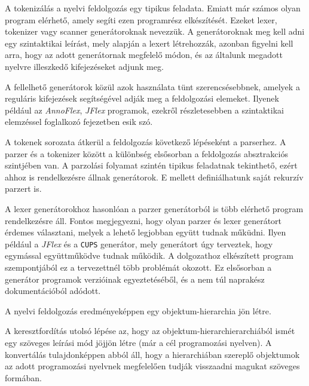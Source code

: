 A tokenizálás a nyelvi feldolgozás egy tipikus feladata.
Emiatt már számos olyan program elérhető, amely segíti ezen programrész elkészítését.
Ezeket lexer, tokenizer vagy scanner generátoroknak nevezzük.
A generátoroknak meg kell adni egy szintaktikai leírást, mely alapján a lexert létrehozzák, azonban figyelni kell arra, hogy az adott generátornak megfelelő módon, és az általunk megadott nyelvre illeszkedő kifejezéseket adjunk meg.

A fellelhető generátorok közül azok használata tünt szerencsésebbnek, amelyek a reguláris kifejezések segítségével adják meg a feldolgozási elemeket. Ilyenek például az \textit{AnnoFlex}, \textit{JFlex} programok, ezekről részletesebben a szintaktikai elemzéssel foglalkozó fejezetben esik szó.


A tokenek sorozata átkerül a feldolgozás következő lépéseként a parserhez.
A parzer és a tokenizer között a különbség elsősorban a feldolgozás absztrakciós szintjében van.
A parzolási folyamat szintén tipikus feladatnak tekinthető, ezért ahhoz is rendelkezésre állnak generátorok.
E mellett definiálhatunk saját rekurzív parzert is.

A lexer generátorokhoz hasonlóan a parzer generátorból is több elérhető program rendelkezésre áll.
Fontos megjegyezni, hogy olyan parzer és lexer generátort érdemes választani, melyek a lehető legjobban együtt tudnak műküdni.
Ilyen például a \textit{JFlex} és a \texttt{CUPS} generátor, mely generátort úgy terveztek, hogy egymással együttműködve tudnak működik.
A dolgozathoz elkészített program szempontjából ez a tervezettnél több problémát okozott.
Ez elsősorban a generátor programok verzióinak egyeztetéséből, és a nem túl naprakész dokumentációból adódott.

A nyelvi feldolgozás eredményeképpen egy objektum-hierarchia jön létre.


A keresztfordítás utolsó lépése az, hogy az objektum-hierarchierarchiából ismét egy szöveges leírási mód jöjjön létre (már a cél programozási nyelven). A konvertálás tulajdonképpen abból áll, hogy a hierarchiában szereplő objektumok az adott programozási nyelvnek megfelelően tudják visszaadni magukat szöveges formában.

